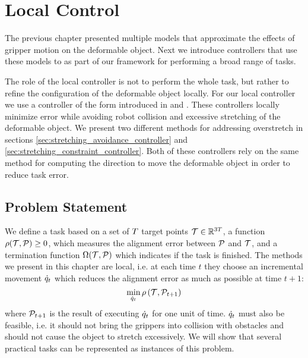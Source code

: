 \chapter{Local Control}
\label{chap:local_control}

The previous chapter presented multiple models that approximate the effects of gripper motion on the deformable object. Next we introduce controllers that use these models to as part of our framework for performing a broad range of tasks.

The role of the local controller is not to perform the whole task, but rather to refine the configuration of the deformable object locally. For our local controller we use a controller of the form introduced in \cite{Berenson2013} and \cite{McConachie2018}. These controllers locally minimize error while avoiding robot collision and excessive stretching of the deformable object. We present two different methods for addressing overstretch in sections \ref{sec:stretching_avoidance_controller} and \ref{sec:stretching_constraint_controller}. Both of these controllers rely on the same method for computing the direction to move the deformable object in order to reduce task error.

\section{Problem Statement}

We define a task based on a set of $T$ target points $\mathcal{T} \in \mathbb{R}^{3 T}$, a function $\rho(\mathcal{T}, \mathcal{P}) \geq 0$, which measures the alignment error between $\mathcal{P}$ and $\mathcal{T}$, and a termination function $\Omega(\mathcal{T}, \mathcal{P})$ which indicates if the task is finished. The methods we present in this chapter are local, i.e. at each time $t$ they choose an incremental movement $\dot{q}_t$ which reduces the alignment error as much as possible at time $t+1$:
\begin{equation}
    \min_{\dot{q}_t} \rho \left(\mathcal{T}, \mathcal{P}_{t+1} \right)
    \label{eqn:ctrl_obj}
\end{equation}
where $\mathcal{P}_{t+1}$ is the result of executing $\dot{q}_t$ for one unit of time. $\dot{q}_t$ must also be feasible, i.e. it should not bring the grippers into collision with obstacles and should not cause the object to stretch excessively. We will show that several practical tasks can be represented as instances of this problem.

